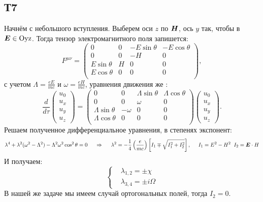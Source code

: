 \subsection*{Т7}
Начнём с небольшого вступления.
Выберем оси $z$ по $\mbox{\boldmath $H$}$, ось $y$ так, чтобы в $ \mbox{\boldmath $E$} \in \text{Oyz}$.
Тогда тензор электромагнитного поля запишется:
\begin{equation*}
	F^{\mu \nu} = 
	\begin{pmatrix}
	    0 & 0 & -E \sin \theta  & -E \cos \theta \\
	    0 & 0 & -H & 0 \\
	    E \sin \theta & H & 0 & 0 \\
	    E \cos \theta & 0 & 0 & 0 \\
	\end{pmatrix},
\end{equation*}
с учетом $\Lambda = \frac{e E}{m c}$ и $\omega = \frac{e H}{m c}$, уравнения движения же :
\begin{equation*}
	\frac{d}{d \tau}
	\begin{pmatrix}
		u_0 \\ u_x \\ u_y \\ u_z
	\end{pmatrix}
	=
	\begin{pmatrix}
	    0 & 0 & \Lambda \sin \theta & \Lambda \cos \theta \\
	    0 & 0 & \omega & 0 \\
	    \Lambda \sin \theta & - \omega & 0 & 0 \\
	    \Lambda \cos \theta & 0 & 0 & 0 \\
	\end{pmatrix}
	\begin{pmatrix}
		u_0 \\ u_x \\ u_y \\ u_z
	\end{pmatrix}.
\end{equation*}
Решаем полученное дифференциальное уравнения, в степенях экспонент:
\begin{equation*}
	\lambda^4 + \lambda^2 (\omega^2 - \Lambda^2) - \Lambda^2 \omega^2 \cos^2 \theta = 0
	\hspace{0.5 cm}
	\Rightarrow
	\hspace{0.5 cm}
	\lambda^2 = -\frac{1}{4} \left(\frac{e}{m c}\right) \left[I_1 \mp \sqrt{I_1^2 + I_2^2}\right],
	\hspace{0.5 cm}
	I_1 = E^2 - H^2
	\hspace{0.2 cm}
	I_2 = \mbox{\boldmath $E$} \cdot H
\end{equation*}
И получаем:
\begin{equation*}
	\left\{
	\begin{aligned}
		&\lambda_{1,2} = \pm \chi \\
		&\lambda_{3,4} = \pm i \Omega
	\end{aligned}\right.
\end{equation*}
В нашей же задаче мы имеем случай ортогональных полей, тогда $I_2 = 0$.

